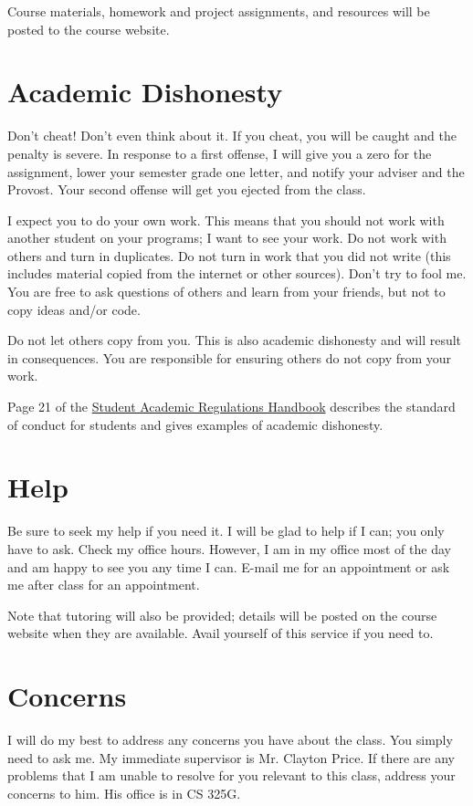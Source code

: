 \documentclass{article}
\begin{document}
Course materials, homework and project assignments, and resources will be posted to the course website.

\section{Academic Dishonesty}
Don't cheat! Don't even think about it.
If you cheat, you will be caught and the penalty is severe.
In response to a first offense, I will give you a zero for the assignment, lower your semester grade one letter, and notify your adviser and the Provost.
Your second offense will get you ejected from the class.

I expect you to do your own work.
This means that you should not work with another student on your programs; I want to see your work.
Do not work with others and turn in duplicates.
Do not turn in work that you did not write (this includes material copied from the internet or other sources).
Don't try to fool me.
You are free to ask questions of others and learn from your friends, but not to copy ideas and/or code.

Do not let others copy from you.
This is also academic dishonesty and will result in consequences.
You are responsible for ensuring others do not copy from your work.

Page 21 of the \href{http://registrar.mst.edu/academicregs/index.html}{Student Academic Regulations Handbook} describes the standard of conduct for students and gives examples of academic dishonesty.

\section{Help}
Be sure to seek my help if you need it.
I will be glad to help if I can; you only have to ask.
Check my office hours.
However, I am in my office most of the day and am happy to see you any time I can.
E-mail me for an appointment or ask me after class for an appointment.

Note that tutoring will also be provided; details will be posted on the course website when they are available.
Avail yourself of this service if you need to.

\section{Concerns}
I will do my best to address any concerns you have about the class.
You simply need to ask me.
My immediate supervisor is Mr. Clayton Price. If there are any problems that I am unable to resolve for you relevant to this class, address your concerns to him. His office is in CS 325G.
\end{document}
